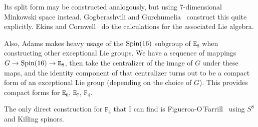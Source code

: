 Its split form may be constructed analogously, but using 7-dimensional
Minkowski space instead.
Gogberashvili and Gurchumelia~\cite{Gogberashvili:2019ojg} construct
this quite explicitly. Ekins and Cornwell~\cite{Ekins:1975yu} do the
calculations for the associated Lie algebra.

\M
Also, Adams makes heavy usage of the $\operatorname{Spin}(16)$ subgroup of
$\mathtt{E}_{8}$ when constructing other exceptional Lie groups.
We have a sequence of mappings $G\to\operatorname{Spin}(16)\to\mathtt{E}_{8}$,
then take the centralizer of the image of $G$ under these maps, and the
identity component of that centralizer turns out to be a compact form of
an exceptional Lie group (depending on the choice of $G$).
This provides compact forms for $\mathtt{E}_{6}$, $\mathtt{E}_{7}$,
$\mathtt{F}_{4}$.

The only direct construction for $\mathtt{F}_{4}$
that I can find is Figueroa-O'Farrill~\cite{Figueroa-OFarrill:2007jcv}
using $S^{8}$ and Killing spinors.
